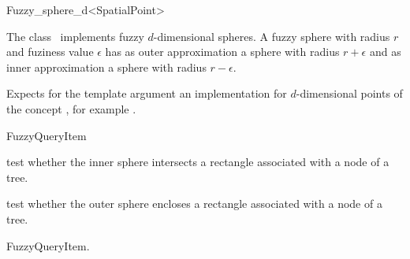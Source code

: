 

\begin{ccRefClass}{Fuzzy_sphere_d<SpatialPoint>}  %


\ccDefinition
  
The class \ccRefName\ implements fuzzy $d$-dimensional spheres.
A fuzzy sphere with radius $r$ and fuziness value $\epsilon$ has
as outer approximation a sphere with radius $r+\epsilon$ and
as inner approximation a sphere with radius $r-\epsilon$. 


\ccParameters


Expects for the template argument
an implementation for $d$-dimensional points
of the concept ,
for example .
\ccIsModel

FuzzyQueryItem

\ccTypes


\ccCreation
{}  %




\ccOperations


{test whether the inner sphere intersects a rectangle
associated with a node of a tree.}

{test whether the outer sphere encloses a rectangle
associated with a node of a tree.}

\ccSeeAlso

FuzzyQueryItem.

\end{ccRefClass}


